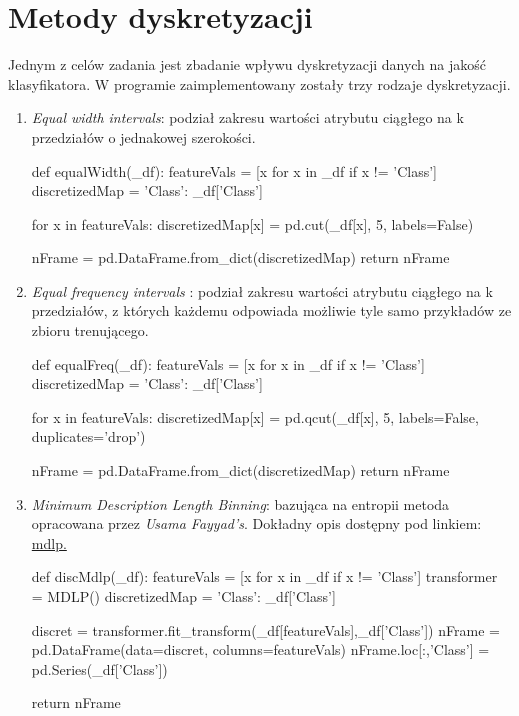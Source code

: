 \documentclass[12pt,a4paper]{article}
\begin{document}
\section{Metody dyskretyzacji}
Jednym z celów zadania jest zbadanie wpływu dyskretyzacji danych na jakość klasyfikatora. W programie zaimplementowany zostały trzy rodzaje dyskretyzacji.
\begin{enumerate}
\item \emph{Equal width intervals}: podział zakresu wartości atrybutu ciągłego na k przedziałów o jednakowej szerokości.
\begin{python}
def equalWidth(_df):
    featureVals = [x for x in _df if x != 'Class']
    discretizedMap = {'Class': _df['Class']}

    for x in featureVals:
        discretizedMap[x] = pd.cut(_df[x], 5, labels=False)

    nFrame = pd.DataFrame.from_dict(discretizedMap)
    return nFrame
\end{python}
\item \emph{Equal frequency intervals }: podział zakresu wartości atrybutu ciągłego na k przedziałów, z których każdemu odpowiada możliwie tyle samo przykładów ze zbioru trenującego.
\begin{python}

def equalFreq(_df):
    featureVals = [x for x in _df if x != 'Class']
    discretizedMap = {'Class': _df['Class']}

    for x in featureVals:
        discretizedMap[x] = pd.qcut(_df[x], 5, labels=False, duplicates='drop')

    nFrame = pd.DataFrame.from_dict(discretizedMap)
    return nFrame
\end{python}

\item \emph{Minimum Description Length Binning}: bazująca na entropii metoda opracowana przez \emph{Usama Fayyad's}. Dokładny opis dostępny pod linkiem: 
\href{http://web.donga.ac.kr/kjunwoo/files/Multi%20interval%20discretization%20of%20continuous%20valued%20attributes%20for%20classification%20learning.pdf}{mdlp.}

\begin{python}
def discMdlp(_df):
    featureVals = [x for x in _df if x != 'Class']
    transformer = MDLP()
    discretizedMap = {'Class': _df['Class']}

    discret = transformer.fit_transform(_df[featureVals],_df['Class'])
    nFrame = pd.DataFrame(data=discret, columns=featureVals)
    nFrame.loc[:,'Class'] = pd.Series(_df['Class'])
    
    return nFrame
\end{python}
\end{enumerate}
\end{document}
